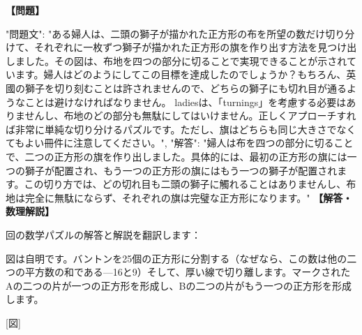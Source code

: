 \documentclass[10pt,a4paper,oneside,openany]{ltjsbook}
\begin{document}
\begin{tcolorbox}[colback=softblue,colframe=primaryblue,title=\textbf{第 171 問：THE BANNER PUZZLE.},arc=2mm,boxrule=1pt,breakable]
\textbf{【問題】}\par\vspace{0.3em}
{
  "問題文": "ある婦人は、二頭の獅子が描かれた正方形の布を所望の数だけ切り分けて、それぞれに一枚ずつ獅子が描かれた正方形の旗を作り出す方法を見つけ出しました。その図は、布地を四つの部分に切ることで実現できることが示されています。婦人はどのようにしてこの目標を達成したのでしょうか？もちろん、英國の獅子を切り刻むことは許されませんので、どちらの獅子にも切れ目が通るようなことは避けなければなりません。 ladiesは、「turnings」を考慮する必要はありませんし、布地のどの部分も無駄にしてはいけません。正しくアプローチすれば非常に単純な切り分けるパズルです。ただし、旗はどちらも同じ大きさでなくてもよい冊件に注意してください。",
  "解答": "婦人は布を四つの部分に切ることで、二つの正方形の旗を作り出しました。具体的には、最初の正方形の旗には一つの獅子が配置され、もう一つの正方形の旗にはもう一つの獅子が配置されます。この切り方では、どの切れ目も二頭の獅子に觸れることはありませんし、布地は完全に無駄にならず、それぞれの旗は完璧な正方形になります。"
}
\tcblower
\textbf{【解答・数理解説】}\par\vspace{0.3em}
回の数学パズルの解答と解説を翻訳します：

図は自明です。バントンを25個の正方形に分割する（なぜなら、この数は他の二つの平方数の和である—16と9）そして、厚い線で切り離します。マークされたAの二つの片が一つの正方形を形成し、Bの二つの片がもう一つの正方形を形成します。

[図]
\end{tcolorbox}
\end{document}
